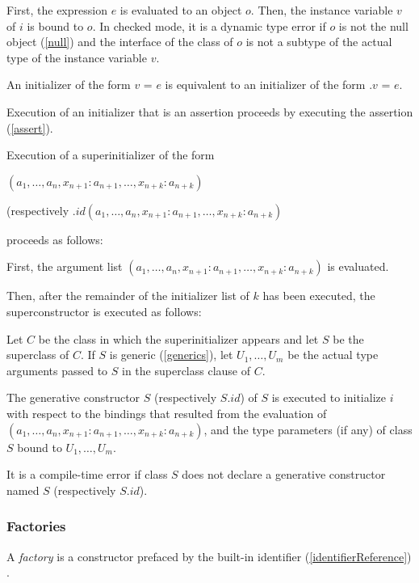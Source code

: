 \documentclass{article}
\newcommand{\code}[1]{{\sf #1}}
\begin{document}
\LMHash{}
First, the expression $e$ is evaluated to an object $o$.
Then, the instance variable $v$ of $i$ is bound to $o$.
In checked mode, it is a dynamic type error if $o$ is not the null object (\ref{null}) and the interface of the class of $o$ is not a subtype of the actual type of the instance variable $v$.

\LMHash{}
An initializer of the form \code{$v$ = $e$} is equivalent to an initializer of the form \code{\THIS{}.$v$ = $e$}.

\LMHash{}
Execution of an initializer that is an assertion proceeds by executing the assertion (\ref{assert}).

\LMHash{}
Execution of a superinitializer of the form

\SUPER{}$(a_1, \ldots, a_n,  x_{n+1}: a_{n+1}, \ldots, x_{n+k}: a_{n+k})$

(respectively  \SUPER{}$.id(a_1, \ldots, a_n, x_{n+1}: a_{n+1}, \ldots, x_{n+k}: a_{n+k})$

proceeds as follows:

\LMHash{}
First, the argument list $(a_1, \ldots, a_n, x_{n+1}: a_{n+1}, \ldots, x_{n+k}: a_{n+k})$ is evaluated.

\LMHash{}
Then, after the remainder of the initializer list of $k$ has been executed,
the superconstructor is executed as follows:

\LMHash{}
Let $C$ be the class in which the superinitializer appears and let $S$ be the superclass of $C$.  If $S$ is generic (\ref{generics}), let $U_1, \ldots, U_m$ be the actual type arguments passed to $S$ in the superclass clause of $C$.

\LMHash{}
The generative constructor $S$ (respectively $S.id$) of $S$ is executed
to initialize $i$ with respect to the bindings that resulted from the evaluation of
$(a_1, \ldots , a_n, x_{n+1}: a_{n+1}, \ldots , x_{n+k}: a_{n+k})$,
and the type parameters (if any) of class $S$ bound to $U_1, \ldots, U_m$.

\LMHash{}
It is a compile-time error if class $S$ does not declare a generative constructor named $S$ (respectively $S.id$).

\subsubsection{Factories}

\LMHash{}
A {\em factory} is a constructor prefaced by the built-in identifier  (\ref{identifierReference})   \FACTORY{}.
\end{document}
